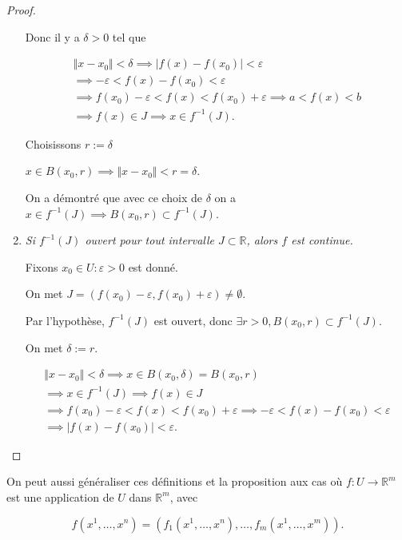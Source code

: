 \documentclass[french]{article}
\theoremstyle{definition}
\newcommand{\lesss}{<}
\newcommand{\less}{\lesss}
\newcommand{\biggg}{>}
\newcommand{\bg}{\biggg}
\begin{document}
\begin{proof}
\begin{enumerate}
    Donc il y a $\delta \bg 0$ tel que

    \begin{gather*}
      \Vert x-x_0 \Vert \less \delta  \implies \lvert f(x)- f(x_0) \rvert \less \varepsilon \\
      \implies - \varepsilon \less f(x) -f(x_0) \less \varepsilon \\
      \implies f(x_0) - \varepsilon \less f(x) \less f(x_0)+ \varepsilon \implies a \less f(x) \less b \\
      \implies f(x) \in J \implies x \in f ^{-1} (J).
    \end{gather*}

    Choisissons $r := \delta $

    $x \in B(x_0, r) \implies \Vert x-x_0 \Vert \less r=\delta  $.

    On a démontré que avec ce choix de $\delta $ on a $x \in f ^{-1} (J) \implies B(x_0, r) \subset f ^{-1} (J)$.

    \item \emph{Si $f ^{-1} (J)$ ouvert pour tout intervalle $J \subset \mathbb{R}$, alors $f$ est continue.}

    Fixons $x_0 \in U : \varepsilon \bg 0$ est donné.

    On met $J = (f(x_0) - \varepsilon , f(x_0)+ \varepsilon ) \neq \emptyset$.

    Par l'hypothèse, $f ^{-1} (J)$ est ouvert, donc $\exists r \bg 0, B(x_0, r) \subset f ^{-1} (J)$.

    On met $\delta := r$.

    \begin{gather*}
      \Vert x-x_0 \Vert \less \delta \implies x \in B(x_0, \delta ) = B(x_0, r)\\
      \implies x \in f ^{-1} (J) \implies f(x) \in J \\
      \implies f(x_0) - \varepsilon \less f(x) \less f(x_0) + \varepsilon \implies - \varepsilon \less f(x) - f(x_0) \less \varepsilon \\
      \implies \lvert f(x) - f(x_0) \rvert \less \varepsilon .
    \end{gather*}
  \end{enumerate}
\end{proof}

On peut aussi généraliser ces définitions et la proposition aux cas où $f: U \to \mathbb{R}^m$ est une application de $U$ dans $\mathbb{R}^m$, avec

$$ f(x^1, \dots, x^n) = (f_1(x^1, \dots, x^n), \dots, f_m(x^1, \dots, x^m)).$$
\end{document}

